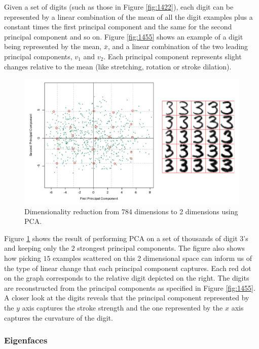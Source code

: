\documentclass[a4paper]{article}
\begin{document}
Given a set of digits (such as those in Figure \ref{fig:1422}), each digit can be represented by a linear combination of the mean of all the digit examples plus a constant times the first principal component and the same for the second principal component and so on.  Figure \ref{fig:1455} shows an example of a digit being represented by the mean, $\bar{x}$, and a linear combination of the two leading principal components, $v_1$ and $v_2$. Each principal component represents slight changes relative to the mean (like stretching, rotation or stroke dilation). 

\begin{figure}
\centering
\includegraphics[width=1.0\textwidth]{Figure1423.png}
\caption{\label{fig:1423} Dimensionality reduction from 784 dimensions to 2 dimensions using PCA.}
\end{figure}

Figure \ref{fig:1423} shows the result of performing PCA on a set of thousands of digit $3$'s and keeping only the $2$ strongest principal components. The figure also shows how picking $15$ examples scattered on this 2 dimensional space can inform us of the type of linear change that each principal component captures. Each red dot on the graph corresponds to the relative digit depicted on the right. The digits are reconstructed from the principal components as specified in Figure \ref{fig:1455}. A closer look at the digits reveals that the principal component represented by the $y$ axis captures the stroke strength and the one represented by the $x$ axis captures the curvature of the digit.

\subsubsection{Eigenfaces}
\end{document}
